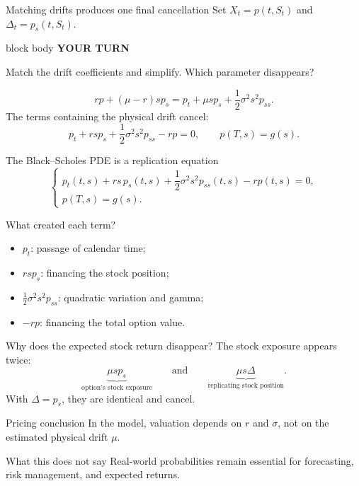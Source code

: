 \documentclass[handout,10pt,aspectratio=169]{beamer}
\newenvironment{pausebox}{%
  \begin{beamercolorbox}[rounded=true,sep=0.8em,wd=\textwidth]{block body}
  \textbf{\color{CourseGold}YOUR TURN}\quad
}{\end{beamercolorbox}}
\newcommand{\1}{\mathbf 1}
\begin{document}
\begin{frame}{Matching drifts produces one final cancellation}
Set \(X_t=p(t,S_t)\) and \(\Delta_t=p_s(t,S_t)\).
\begin{pausebox}
Match the drift coefficients and simplify. Which parameter disappears?
\end{pausebox}

\[
rp+(\mu-r)sp_s
=p_t+\mu sp_s+\frac12\sigma^2s^2p_{ss}.
\]
The terms containing the physical drift cancel:
\[
\boxed{
p_t+rsp_s+\frac12\sigma^2s^2p_{ss}-rp=0,}
\qquad
\boxed{p(T,s)=g(s).}
\]
\end{frame}

\begin{frame}{The Black--Scholes PDE is a replication equation}
\[
\boxed{
\begin{cases}
p_t(t,s)+rs\,p_s(t,s)
+\dfrac12\sigma^2s^2p_{ss}(t,s)-rp(t,s)=0,\\[0.4em]
p(T,s)=g(s).
\end{cases}}
\]
\begin{exampleblock}{What created each term?}
\begin{itemize}
  \item \(p_t\): passage of calendar time;
  \item \(rsp_s\): financing the stock position;
  \item \(\tfrac12\sigma^2s^2p_{ss}\): quadratic variation and gamma;
  \item \(-rp\): financing the total option value.
\end{itemize}
\end{exampleblock}
\end{frame}

\begin{frame}{Why does the expected stock return disappear?}
The stock exposure appears twice:
\[
\underbrace{\mu sp_s}_{\text{option's stock exposure}}
\qquad\text{and}\qquad
\underbrace{\mu s\Delta}_{\text{replicating stock position}}.
\]
With \(\Delta=p_s\), they are identical and cancel.
\begin{block}{Pricing conclusion}
In the model, valuation depends on \(r\) and \(\sigma\), not on the estimated
physical drift \(\mu\).
\end{block}
\begin{alertblock}{What this does not say}
Real-world probabilities remain essential for forecasting, risk management,
and expected returns.
\end{alertblock}
\end{frame}
\end{document}
